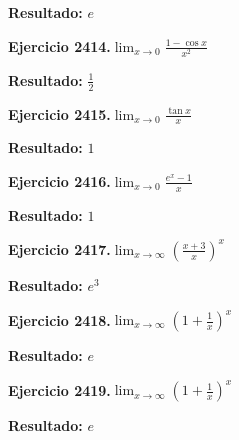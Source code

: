 \documentclass[10pt,a4paper]{article}
\begin{document}
\begin{solbox}
\textbf{Resultado:} \(\displaystyle e\)
\end{solbox}

\begin{ejbox}
\textbf{Ejercicio 2414.}\quad $\lim_{x\to 0} \frac{1-\cos x}{x^2}$
\end{ejbox}

\begin{solbox}
\textbf{Resultado:} \(\displaystyle \frac{1}{2}\)
\end{solbox}

\newpage
\begin{ejbox}
\textbf{Ejercicio 2415.}\quad $\lim_{x\to 0} \frac{\tan x}{x}$
\end{ejbox}

\begin{solbox}
\textbf{Resultado:} \(\displaystyle 1\)
\end{solbox}

\begin{ejbox}
\textbf{Ejercicio 2416.}\quad $\lim_{x\to 0} \frac{e^x-1}{x}$
\end{ejbox}

\begin{solbox}
\textbf{Resultado:} \(\displaystyle 1\)
\end{solbox}

\begin{ejbox}
\textbf{Ejercicio 2417.}\quad $\lim_{x\to \infty} \left(\frac{x+3}{x}\right)^{x}$
\end{ejbox}

\begin{solbox}
\textbf{Resultado:} \(\displaystyle e^{3}\)
\end{solbox}

\newpage
\begin{ejbox}
\textbf{Ejercicio 2418.}\quad $\lim_{x\to \infty} \left(1+\frac{1}{x}\right)^x$
\end{ejbox}

\begin{solbox}
\textbf{Resultado:} \(\displaystyle e\)
\end{solbox}

\begin{ejbox}
\textbf{Ejercicio 2419.}\quad $\lim_{x\to \infty} \left(1+\frac{1}{x}\right)^x$
\end{ejbox}

\begin{solbox}
\textbf{Resultado:} \(\displaystyle e\)
\end{solbox}
\end{document}
